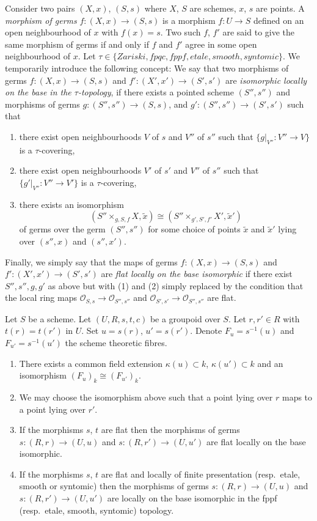 \noindent
Consider two pairs $(X, x)$, $(S, s)$
where $X$, $S$ are schemes, $x$, $s$ are points.
A {\it morphism of germs} $f : (X, x) \to (S, s)$
is a morphism $f : U \to S$ defined on an open neighbourhood
of $x$ with $f(x) = s$. Two such
$f$, $f'$ are said to give the same morphism of germs
if and only if $f$ and $f'$ agree in some open neighbourhood of $x$.
Let $\tau \in \{Zariski, fpqc, fppf, etale, smooth, syntomic\}$.
We temporarily
introduce the following concept: We say that two morphisms
of germs $f : (X, x) \to (S, s)$ and $f' : (X', x') \to (S', s')$
are {\it isomorphic locally on the base in the $\tau$-topology},
if there exists a pointed scheme $(S'', s'')$ and morphisms of germs
$g : (S'', s'') \to (S, s)$, and $g' : (S'', s'') \to (S', s')$
such that
\begin{enumerate}
\item there exist open neighbourhoods $V$ of $s$
and $V''$ of $s''$ such that $\{g|_{V''} : V'' \to V\}$ is
a $\tau$-covering,
\item there exist open neighbourhoods $V'$ of $s'$
and $V''$ of $s''$ such that $\{g'|_{V''} : V'' \to V'\}$ 
is a $\tau$-covering,
\item there exists an isomorphism
$$
(S'' \times_{g, S, f} X, \tilde x)
\cong
(S'' \times_{g', S', f'} X', \tilde  x')
$$
of germs over the germ $(S'', s'')$ for some choice of points
$\tilde x$ and $\tilde x'$ lying over $(s'', x)$ and $(s'', x')$.
\end{enumerate}
Finally, we simply say that the maps of germs
$f : (X, x) \to (S, s)$ and $f' : (X', x') \to (S', s')$
are {\it flat locally on the base isomorphic} if there exist
$S'', s'', g, g'$ as above but with (1) and (2) simply replaced by
the condition that the local ring maps
$\mathcal{O}_{S, s} \to \mathcal{O}_{S'', s''}$
and $\mathcal{O}_{S', s'} \to \mathcal{O}_{S'', s''}$ are flat.

\begin{lemma}
\label{lemma-two-fibres}
Let $S$ be a scheme.
Let $(U, R, s, t, c)$ be a groupoid over $S$.
Let $r, r' \in R$ with $t(r) = t(r')$ in $U$.
Set $u = s(r)$, $u' = s(r')$.
Denote $F_u = s^{-1}(u)$ and $F_{u'} = s^{-1}(u')$ the scheme
theoretic fibres.
\begin{enumerate}
\item There exists a common field extension
$\kappa(u) \subset k$, $\kappa(u') \subset k$ and
an isomorphism $(F_u)_k \cong (F_{u'})_k$.
\item We may choose the isomorphism above such that a point
lying over $r$ maps to a point lying over $r'$.
\item If the morphisms $s$, $t$ are flat then the morphisms of germs
$s : (R, r) \to (U, u)$ and $s : (R, r') \to (U, u')$ are flat
locally on the base isomorphic.
\item If the morphisms $s$, $t$ are
flat and locally of finite presentation (resp.\ etale, smooth or
syntomic) then the morphisms of germs $s : (R, r) \to (U, u)$
and $s : (R, r') \to (U, u')$ are locally on the base isomorphic
in the fppf (resp.\ etale, smooth, syntomic) topology.
\end{enumerate}
\end{lemma}

